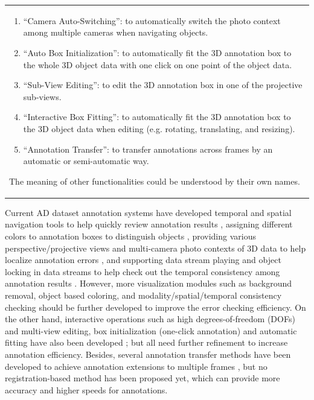 \documentclass[letterpaper, 10 pt, conference]{ieeeconf}  %
\begin{document}
\begin{table}[h]
\begin{tabular}{p{17.5cm}}
\begin{enumerate}
			\item ``Camera Auto-Switching'': to automatically switch the photo context among multiple cameras when navigating objects.
			
			\item ``Auto Box Initialization'': to automatically fit the 3D annotation box to the whole 3D object data with one click on one point of the object data.
			
			\item ``Sub-View Editing'': to edit the 3D annotation box in one of the projective sub-views.
			
			\item ``Interactive Box Fitting'': to automatically fit the 3D annotation box to the 3D object data when editing (e.g. rotating, translating, and resizing).
			
			\item ``Annotation Transfer'': to transfer annotations across frames by an automatic or semi-automatic way.
			
		\end{enumerate}
		The meaning of other functionalities could be understood by their own names.
		
		
		
	\end{tabular}
	\label{tab:annotationMethods}
	\vspace{-0.5cm}
\end{table}




Current AD dataset annotation systems have developed temporal and spatial navigation tools to help quickly review annotation results \cite{Playment,SUPERVISELY,Wang2019LATTEAL,Zimmer20193DBA}, 
assigning different colors to annotation boxes to distinguish objects \cite{SUPERVISELY,Zimmer20193DBA,Playment,scale}, 
providing various perspective/projective views and multi-camera photo contexts of 3D data to help localize annotation errors \cite{SUPERVISELY,Playment,Zimmer20193DBA}, 
and supporting data stream playing and object locking in data streams to help check out the temporal consistency among annotation results \cite{Playment}.
However, more visualization modules such as background removal, object based coloring, and modality/spatial/temporal consistency checking should be further developed to improve the error checking efficiency.
On the other hand, interactive operations such as high degrees-of-freedom (DOFs) and multi-view editing, box initialization (one-click annotation)
and automatic fitting have also been developed \cite{pointatme,Zimmer20193DBA,Wang2019LATTEAL,SUPERVISELY,Playment}; but all need further refinement to increase annotation efficiency. 
Besides, several annotation transfer methods have been developed to achieve annotation extensions to multiple frames \cite{Playment,Wang2019LATTEAL,Zimmer20193DBA}, 
but no registration-based method has been proposed yet, which can provide more accuracy and higher speeds for annotations.
\end{document}
